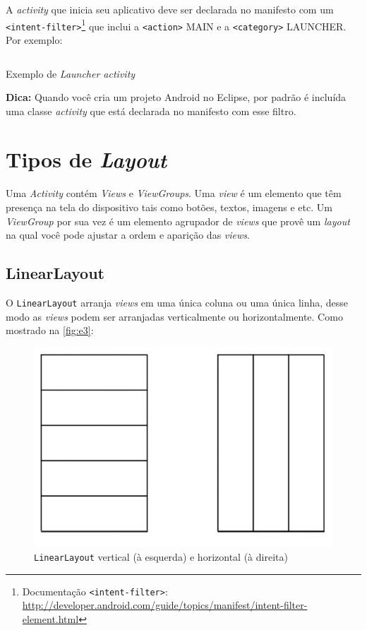 \documentclass[a4paper,12pt,brazil,oneside]{book}
\begin{document}
\begin{singlespace}
 A \emph{activity} que inicia seu aplicativo deve ser declarada no manifesto com um \texttt{<intent-filter>}\footnote{Documentação \texttt{<intent-filter>}: \href{http://developer.android.com/guide/topics/manifest/intent-filter-element.html}{http://developer.android.com/guide/topics/manifest/intent-filter-element.html}} que inclui a \texttt{<action>} MAIN e a \texttt{<category>} LAUNCHER. Por exemplo:
 
\begin{listing}[H]
\inputminted[linenos=true,fontsize=\small,frame=lines, framesep=2mm, tabsize=2,numbersep=5pt]{xml}{src/design/launcher-manifest.xml}
\caption{Exemplo de \emph{Launcher activity}}
\end{listing}

\begin{framed}
\textbf{Dica:} Quando você cria um projeto Android no Eclipse, por padrão é incluída uma classe \emph{activity} que está declarada no manifesto com esse filtro.
\end{framed}

\section{Tipos de \emph{Layout}}
Uma \emph{Activity} contém \emph{Views} e \emph{ViewGroups}. Uma \emph{view} é um elemento que têm presença na tela do dispositivo tais como botões, textos, imagens e etc. Um \emph{ViewGroup} por sua vez é um elemento agrupador de \emph{views} que provê um \emph{layout} na qual você pode ajustar a ordem e aparição das \emph{views}. 

\subsection{LinearLayout}

O \texttt{LinearLayout} arranja \emph{views} em uma única coluna ou uma única linha, desse modo as \emph{views} podem ser arranjadas verticalmente ou horizontalmente. Como mostrado na \autoref{fig:e3}:

\begin{figure}[H]
  \centering
  \includegraphics[width=.45\textwidth]{figuras/design/linearlayout.jpg}
  \caption{\texttt{LinearLayout} vertical (à esquerda) e horizontal (à direita)}
  \label{fig:e3}
\end{figure}


\end{singlespace}
\end{document}
